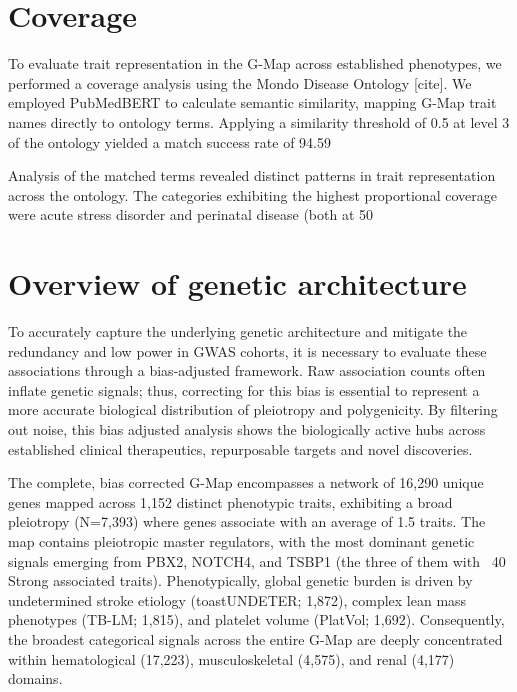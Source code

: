 \section{Coverage}
\label{sec:coverage}
To evaluate trait representation in the G-Map across established phenotypes, we performed a coverage analysis using the Mondo Disease Ontology [cite]. We employed PubMedBERT to calculate semantic similarity, mapping G-Map trait names directly to ontology terms. Applying a similarity threshold of 0.5 at level 3 of the ontology yielded a match success rate of 94.59%

Analysis of the matched terms revealed distinct patterns in trait representation across the ontology. The categories exhibiting the highest proportional coverage were acute stress disorder and perinatal disease (both at 50%
\section{Overview of genetic architecture}
\label{sec:gen_arch}
To accurately capture the underlying genetic architecture and mitigate the redundancy and low power in GWAS cohorts, it is necessary to evaluate these associations through a bias-adjusted framework. Raw association counts often inflate genetic signals; thus, correcting for this bias is essential to represent a more accurate biological distribution of pleiotropy and polygenicity. By filtering out noise, this bias adjusted analysis shows the biologically active hubs across established clinical therapeutics, repurposable targets and novel discoveries.

The complete, bias corrected G-Map encompasses a network of 16,290 unique genes mapped across 1,152 distinct phenotypic traits, exhibiting a broad pleiotropy (N=7,393) where genes associate with an average of 1.5 traits. The map contains pleiotropic master regulators, with the most dominant genetic signals emerging from PBX2, NOTCH4, and TSBP1 (the three of them with ~40 Strong associated traits). Phenotypically, global genetic burden is driven by undetermined stroke etiology (toastUNDETER; 1,872), complex lean mass phenotypes (TB-LM; 1,815), and platelet volume (PlatVol; 1,692). Consequently, the broadest categorical signals across the entire G-Map are deeply concentrated within hematological (17,223), musculoskeletal (4,575), and renal (4,177) domains.

